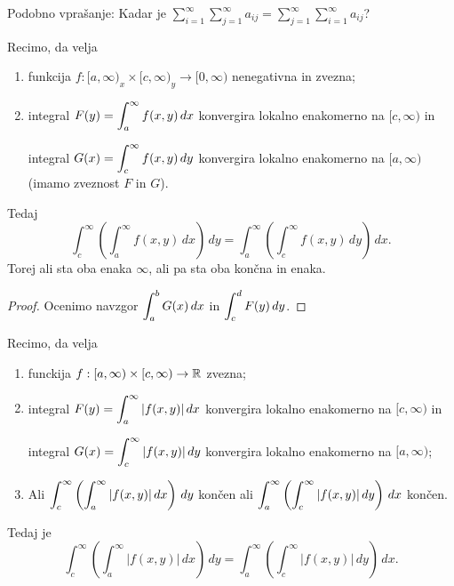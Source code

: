 \begin{opomba}
    Podobno vprašanje: Kadar je \(\sum_{i=1}^{\infty}\sum_{j=1}^{\infty}a_{ij} = \sum_{j=1}^{\infty}\sum_{i=1}^{\infty}a_{ij}\)?
\end{opomba}
\begin{trditev}
    Recimo, da velja
    \begin{enumerate}
        \item funkcija \(f:[a, \infty)_x \times [c,\infty)_y \to [0, \infty)\) nenegativna in zvezna;
        \item integral \(\displaystyle F(y) = \int_{a}^{\infty} f(x,y) \, dx\) konvergira lokalno enakomerno na \([c, \infty)\) in
        
        integral \(\displaystyle G(x) = \int_{c}^{\infty} f(x,y) \, dy\) konvergira lokalno enakomerno na \([a, \infty)\) (imamo zveznost $F$ in $G$).
    \end{enumerate}
    Tedaj 
    \[\int_{c}^{\infty}\left(\int_{a}^{\infty} f(x,y) \, dx\right) \, dy = \int_{a}^{\infty}\left(\int_{c}^{\infty} f(x,y) \, dy\right) \, dx.\]
    Torej ali sta oba enaka \(\infty\), ali pa sta oba končna in enaka.
\end{trditev}

\begin{proof}
    Ocenimo navzgor \(\displaystyle \int_{a}^{b} G(x) \, dx\) in \(\displaystyle \int_{c}^{d} F(y) \, dy\).
\end{proof}

\begin{trditev}
    Recimo, da velja
    \begin{enumerate}
        \item funckija \(f:[a, \infty) \times [c,\infty) \to \mathbb{R}\) zvezna;
        \item integral \(\displaystyle F(y) = \int_{a}^{\infty} |f(x,y)| \, dx\) konvergira lokalno enakomerno na \([c, \infty)\) in
        
        integral \(\displaystyle G(x) = \int_{c}^{\infty} |f(x,y)| \, dy\) konvergira lokalno enakomerno na \([a, \infty)\);
        \item Ali \(\displaystyle \int_{c}^{\infty}\left(\int_{a}^{\infty} |f(x,y)| \, dx\right) \, dy\) končen ali \(\displaystyle \int_{a}^{\infty}\left(\int_{c}^{\infty} |f(x,y)| \, dy\right) \, dx\) končen.
    \end{enumerate}
    Tedaj je 
    \[\int_{c}^{\infty}\left(\int_{a}^{\infty} |f(x,y)| \, dx\right) \, dy = \int_{a}^{\infty}\left(\int_{c}^{\infty} |f(x,y)| \, dy\right) \, dx.\]
\end{trditev}

